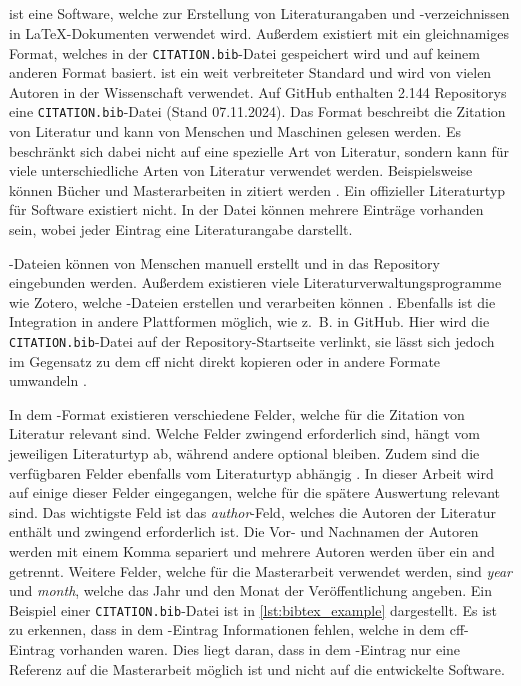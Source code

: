 \subsection{}
\label{subsec:bibtex_format}
 ist eine Software, welche zur Erstellung von Literaturangaben und -verzeichnissen in \LaTeX{}-Dokumenten verwendet wird.
Außerdem existiert mit  ein gleichnamiges Format, welches in der \texttt{CITATION.bib}-Datei gespeichert wird und auf keinem anderen Format basiert.
 ist ein weit verbreiteter Standard und wird von vielen Autoren in der Wissenschaft verwendet.
Auf GitHub enthalten 2.144 Repositorys eine \texttt{CITATION.bib}-Datei (Stand 07.11.2024).
Das Format beschreibt die Zitation von Literatur und kann von Menschen und Maschinen gelesen werden.
Es beschränkt sich dabei nicht auf eine spezielle Art von Literatur, sondern kann für viele unterschiedliche Arten von Literatur verwendet werden.
Beispielsweise können Bücher und Masterarbeiten in  zitiert werden \autocite{patashnik_bibtexing_1988}.
Ein offizieller Literaturtyp für Software existiert nicht.
In der Datei können mehrere Einträge vorhanden sein, wobei jeder Eintrag eine Literaturangabe darstellt.

-Dateien können von Menschen manuell erstellt und in das Repository eingebunden werden.
Außerdem existieren viele Literaturverwaltungsprogramme wie Zotero, welche -Dateien erstellen und verarbeiten können \autocite{zotero_zotero_2024}.
Ebenfalls ist die Integration in andere Plattformen möglich, wie z.~B. in GitHub.
Hier wird die \texttt{CITATION.bib}-Datei auf der Repository-Startseite verlinkt, sie lässt sich jedoch im Gegensatz zu dem \gls{cff} nicht direkt kopieren oder in andere Formate umwandeln \autocite{github_about_2024-1}.

In dem -Format existieren verschiedene Felder, welche für die Zitation von Literatur relevant sind.
Welche Felder zwingend erforderlich sind, hängt vom jeweiligen Literaturtyp ab, während andere optional bleiben.
Zudem sind die verfügbaren Felder ebenfalls vom Literaturtyp abhängig \autocite{patashnik_bibtexing_1988}.
In dieser Arbeit wird auf einige dieser Felder eingegangen, welche für die spätere Auswertung relevant sind.
Das wichtigste Feld ist das \emph{author}-Feld, welches die Autoren der Literatur enthält und zwingend erforderlich ist.
Die Vor- und Nachnamen der Autoren werden mit einem Komma separiert und mehrere Autoren werden über ein \glqq and\grqq{} getrennt.
Weitere Felder, welche für die Masterarbeit verwendet werden, sind \emph{year} und \emph{month}, welche das Jahr und den Monat der Veröffentlichung angeben.
Ein Beispiel einer \texttt{CITATION.bib}-Datei ist in \autoref{lst:bibtex_example} dargestellt.
Es ist zu erkennen, dass in dem -Eintrag Informationen fehlen, welche in dem \gls{cff}-Eintrag vorhanden waren.
Dies liegt daran, dass in dem -Eintrag nur eine Referenz auf die Masterarbeit möglich ist und nicht auf die entwickelte Software.

